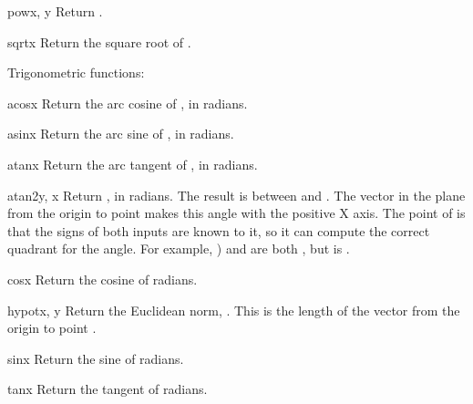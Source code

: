 \begin{funcdesc}{pow}{x, y}
Return .
\end{funcdesc}

\begin{funcdesc}{sqrt}{x}
Return the square root of .
\end{funcdesc}

Trigonometric functions:

\begin{funcdesc}{acos}{x}
Return the arc cosine of , in radians.
\end{funcdesc}

\begin{funcdesc}{asin}{x}
Return the arc sine of , in radians.
\end{funcdesc}

\begin{funcdesc}{atan}{x}
Return the arc tangent of , in radians.
\end{funcdesc}

\begin{funcdesc}{atan2}{y, x}
Return , in radians.
The result is between  and .
The vector in the plane from the origin to point 
makes this angle with the positive X axis.
The point of  is that the signs of both inputs are
known to it, so it can compute the correct quadrant for the angle.
For example, ) and  are both ,
but  is .
\end{funcdesc}

\begin{funcdesc}{cos}{x}
Return the cosine of  radians.
\end{funcdesc}

\begin{funcdesc}{hypot}{x, y}
Return the Euclidean norm, .
This is the length of the vector from the origin to point
.
\end{funcdesc}

\begin{funcdesc}{sin}{x}
Return the sine of  radians.
\end{funcdesc}

\begin{funcdesc}{tan}{x}
Return the tangent of  radians.
\end{funcdesc}

